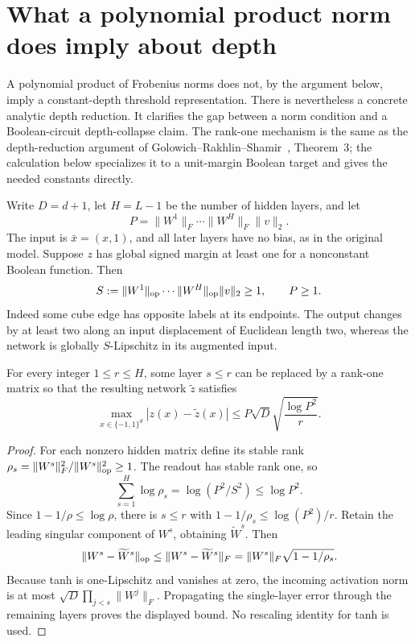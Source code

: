 \section{What a polynomial product norm does imply about depth}
\label{sec:product-norm-depth-reduction}

A polynomial product of Frobenius norms does not, by the argument below,
imply a constant-depth threshold representation. There is nevertheless a
concrete analytic depth reduction. It clarifies the gap between a norm
condition and a Boolean-circuit depth-collapse claim.
The rank-one mechanism is the same as the depth-reduction argument of
Golowich--Rakhlin--Shamir~\cite{golowich2018}, Theorem~3; the calculation
below specializes it to a unit-margin Boolean target and gives the
needed constants directly.

Write $D=d+1$, let $H=L-1$ be the number of hidden layers, and let
\[
 P=\|W^1\|_F\cdots\|W^H\|_F\|v\|_2.
\]
The input is $\bar x=(x,1)$, and all later layers have no bias, as in the
original model. Suppose $z$ has global signed margin at least one for a
nonconstant Boolean function. Then
\begin{equation}\label{eq:pf-spectral-lower}
 S:=\|W^1\|_{\rm op}\cdots\|W^H\|_{\rm op}\|v\|_2\ge1,
 \qquad P\ge1.
\end{equation}
Indeed some cube edge has opposite labels at its endpoints. The output
changes by at least two along an input displacement of Euclidean length
two, whereas the network is globally $S$-Lipschitz in its augmented input.

\begin{lemma}
\label{lem:early-rank-one-layer}
For every integer $1\le r\le H$, some layer $s\le r$ can be replaced by
a rank-one matrix so that the resulting network $\widetilde z$ satisfies
\[
 \max_{x\in\{-1,1\}^d}|z(x)-\widetilde z(x)|
 \le P\sqrt{D}\sqrt{\frac{\log P^2}{r}}.
\]
\end{lemma}
\begin{proof}
For each nonzero hidden matrix define its stable rank
$\rho_s=\|W^s\|_F^2/\|W^s\|_{\rm op}^2\ge1$.
The readout has stable rank one, so
\[
 \sum_{s=1}^H\log\rho_s=\log(P^2/S^2)\le\log P^2.
\]
Since $1-1/\rho\le\log\rho$, there is $s\le r$ with
$1-1/\rho_s\le\log(P^2)/r$.
Retain the leading singular component of $W^s$, obtaining $\widetilde W^s$.
Then
\[
 \|W^s-\widetilde W^s\|_{\rm op}
 \le\|W^s-\widetilde W^s\|_F
 =\|W^s\|_F\sqrt{1-1/\rho_s}.
\]
Because tanh is one-Lipschitz and vanishes at zero, the incoming activation
norm is at most $\sqrt D\prod_{j<s}\|W^j\|_F$.
Propagating the single-layer error through the remaining layers proves
the displayed bound. No rescaling identity for tanh is used.
\end{proof}

